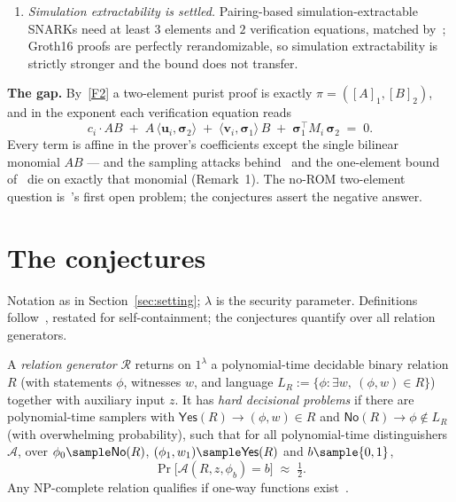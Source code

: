 \documentclass{conjura-conjecture}
\newcommand{\bsig}{\boldsymbol{\sigma}}
\newcommand{\LR}{L_R}
\newcommand{\Yes}{\mathsf{Yes}}
\newcommand{\No}{\mathsf{No}}
\begin{document}
\begin{enumerate}[label=(F\arabic*),ref=F\arabic*,leftmargin=*,itemsep=1pt,topsep=2pt]
  bits~\cite{DMS24}.  Element count and bit count thus part ways;
  the conjectures concern the former.
  (d)~\emph{Interaction; designated verifiers.}  One round of
  interaction yields one-element proofs~\cite{BIOW20};
  designated-verifier SNARGs reach one element plus $O(\lambda)$
  bits~\cite{ADI25}.  Non-interactivity and public verifiability are
  load-bearing too.
\item\label{F4} \emph{Simulation extractability is settled.}
  Pairing-based simulation-extractable SNARKs need at least $3$
  elements and $2$ verification equations, matched by~\cite{GM17};
  Groth16 proofs are perfectly rerandomizable, so simulation
  extractability is strictly stronger and the bound does not
  transfer.
\end{enumerate}

\smallskip
\noindent\textbf{The gap.}
By~\ref{F2} a two-element purist proof is exactly
$\pi = ([A]_1,[B]_2)$, and in the exponent each verification equation
reads
\[
  c_i \cdot AB \;+\; A\,\langle \boldsymbol{u}_i, \bsig_2\rangle
  \;+\; \langle \boldsymbol{v}_i, \bsig_1\rangle\, B
  \;+\; \bsig_1^{\!\top} M_i\, \bsig_2 \;=\; 0 .
\]
Every term is affine in the prover's coefficients except the single
bilinear monomial $AB$ --- and the sampling attacks
behind~\cite[Thms.~3--4]{Gro16} and the one-element bound
of~\cite{ADY25} die on exactly that monomial (Remark~1).  The no-ROM
two-element question is~\cite{ADY25}'s first open problem; the
conjectures assert the negative answer.

\section{The conjectures}\label{sec:conjectures}

Notation as in Section~\ref{sec:setting}; $\lambda$ is the security
parameter.  Definitions follow~\cite{Gro16}, restated for
self-containment; the conjectures quantify over all relation
generators.

\begin{definition}\label{def:hard}
A \emph{relation generator} $\mathcal{R}$ returns on $1^\lambda$ a
polynomial-time decidable binary relation $R$ (with statements
$\phi$, witnesses $w$, and language
$\LR := \{\phi : \exists w,\ (\phi,w) \in R\}$) together with
auxiliary input $z$.  It has \emph{hard decisional problems} if there
are polynomial-time samplers with $\Yes(R) \to (\phi,w) \in R$ and
$\No(R) \to \phi \notin \LR$ (with overwhelming probability), such
that for all polynomial-time distinguishers $\mathcal{A}$, over
$\phi_0 \sample \No(R)$, $(\phi_1,w_1) \sample \Yes(R)$ and
$b \sample \{0,1\}$,
\[
  \Pr\bigl[\mathcal{A}(R,z,\phi_b) = b\bigr] \;\approx\; \tfrac12 .
\]
Any NP-complete relation qualifies if one-way functions
exist~\cite{Gro16}.
\end{definition}
\end{document}
